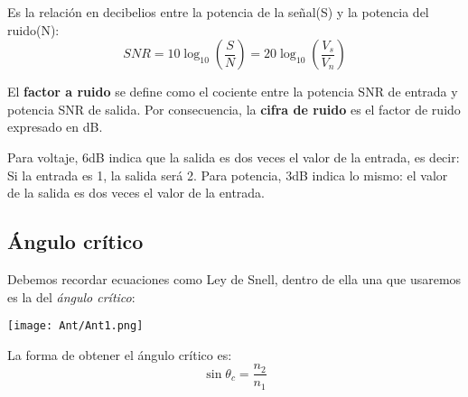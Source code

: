 \documentclass[12pt,fleqn,a4paper,oneside]{LegrandOrangeBook}
\begin{document}
\begin{definition}
Es la relación en decibelios entre la potencia de la señal(S) y la potencia del ruido(N):
\begin{equation}
\label{eq:snr}
SNR=10\log_{10}\left(\frac{S}{N}\right)=20\log_{10}\left(\frac{V_s}{V_n}\right)
\end{equation}
\end{definition}
\begin{remark}
El \textbf{factor a ruido} se define como el cociente entre la potencia SNR de entrada y potencia SNR de salida. Por consecuencia, la \textbf{cifra de ruido} es el factor de ruido expresado en dB.
\end{remark}
\begin{notation}
Para voltaje, 6dB indica que la salida es dos veces el valor de la entrada, es decir: Si la entrada es 1, la salida será 2. Para potencia, 3dB indica lo mismo: el valor de la salida es dos veces el valor de la entrada.
\end{notation}
\subsection*{Ángulo crítico}
Debemos recordar ecuaciones como Ley de Snell, dentro de ella una que usaremos es la del \textit{ángulo crítico}:
\begin{center}
\texttt{[image: Ant/Ant1.png]}
\end{center}
La forma de obtener el ángulo crítico es:
\begin{equation}
\sin\theta_c=\frac{n_2}{n_1}
\label{eq: angulo critico}
\end{equation}
\end{document}
